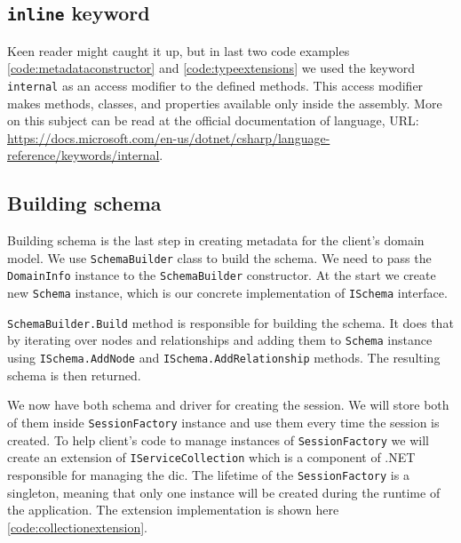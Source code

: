 \subsection{\texttt{inline} keyword}

Keen reader might caught it up, but in last two code examples \ref{code:metadataconstructor} and \ref{code:typeextensions} we used the keyword \texttt{internal}
as an access modifier to the defined methods. This access modifier makes methods, classes, and properties available only inside the assembly. More on this subject
can be read at the official documentation of \CS language, URL: \url{https://docs.microsoft.com/en-us/dotnet/csharp/language-reference/keywords/internal}.

\subsection {Building schema}

Building schema is the last step in creating metadata for the client's domain model.
We use \texttt{SchemaBuilder} class to build the schema. We need to pass the \texttt{DomainInfo} instance to the \texttt{SchemaBuilder} constructor.
At the start we create new \texttt{Schema} instance, which is our concrete implementation of \texttt{ISchema} interface.

\texttt{SchemaBuilder.Build} method is responsible for building the schema. It does that by iterating over nodes and relationships and adding them to \texttt{Schema} instance
using \texttt{ISchema.AddNode} and \texttt{ISchema.AddRelationship} methods. The resulting schema is then returned.

We now have both schema and driver for creating the session. We will store both of them inside \texttt{SessionFactory} instance
and use them every time the session is created. To help client's code to manage instances of \texttt{SessionFactory} we will create an extension
of \texttt{IServiceCollection} which is a component of .NET responsible for managing the \acrfull{dic}. The lifetime of the \texttt{SessionFactory} is
a singleton, meaning that only one instance will be created during the runtime of the application. The extension implementation is shown here \ref{code:collectionextension}.



